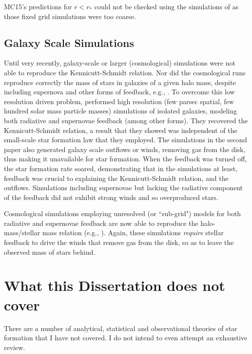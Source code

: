 \documentclass[../dissertation.tex]{subfiles}
\begin{document}
MC15's predictions for $r<r_*$ could not be checked using the simulations
of \citet{2015ApJ...800...49L} as those fixed grid simulations were
too coarse.  


\subsection {Galaxy Scale Simulations}

Until very recently, galaxy-scale or larger (cosmological) simulations 
were not able to reproduce the Kennicutt-Schmidt relation. 
Nor did the cosmological runs reproduce correctly the mass of stars in galaxies of a given 
halo mass, despite including supernova and other forms of feedback, 
e.g., \citet{2010MNRAS.404.1111G,2010Natur.463..203G,2011MNRAS.410.2625P}.
To overcome this low resolution driven problem, \citet{2011MNRAS.417..950H,2012MNRAS.421.3522H}
performed high resolution (few parsec spatial, few hundred solar mass particle masses) simulations 
of isolated galaxies, modeling both radiative and supernovae feedback (among other forms). 
They recovered the Kennicutt-Schmidt relation, a result that they 
showed was independent of the small-scale star formation
law that they employed. 
The simulations in the second paper also generated galaxy 
scale outflows or winds, removing gas from the disk, thus making it unavailable for star 
formation. 
When the feedback was turned off, the star formation rate soared, demonstrating that
in the simulations at least, feedback was crucial to explaining the Kennicutt-Schmidt relation, and
the outflows. 
Simulations including supernovae but lacking the radiative component of the feedback
did not exhibit strong winds and so overproduced stars.

Cosmological simulations employing unresolved (or ``sub-grid") models for both 
radiative and supernovae feedback are now able to reproduce the halo-mass/stellar mass relation (e.g.,
\citealt{2013MNRAS.434.3142A,2014MNRAS.445..581H,2015ApJ...804...18A}). Again, 
these simulations {\em require} 
stellar feedback to drive the winds that remove gas from the disk, so as to leave the observed mass of stars behind. 


\section{What this Dissertation does not cover}
There are a number of analytical, statistical and observational theories of star formation that I have not covered.
 I do not intend to even attempt an exhaustive review.
\end{document}
